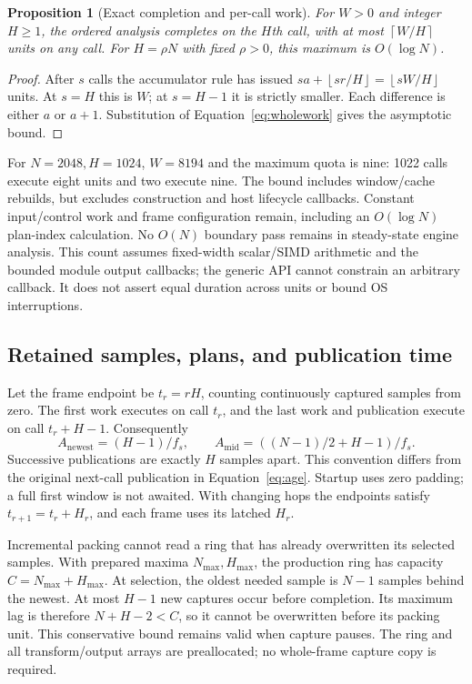 \documentclass[11pt,letterpaper]{article}
\newtheorem{proposition}{Proposition}
\newcommand{\ceil}[1]{\left\lceil #1\right\rceil}
\newcommand{\floor}[1]{\left\lfloor #1\right\rfloor}
\begin{document}
\begin{proposition}[Exact completion and per-call work]
For $W>0$ and integer $H\ge1$, the ordered analysis completes on the $H$th
call, with at most $\ceil{W/H}$ units on any call. For $H=\rho N$ with fixed
$\rho>0$, this maximum is $O(\log N)$.
\end{proposition}
\begin{proof}
After $s$ calls the accumulator rule has issued
$sa+\floor{sr/H}=\floor{sW/H}$ units. At $s=H$ this is $W$;
at $s=H-1$ it is strictly smaller. Each difference is either $a$ or $a+1$.
Substitution of Equation~\eqref{eq:wholework} gives the asymptotic bound.
\end{proof}
For $N=2048,H=1024$, $W=8194$ and the maximum quota is nine: 1022 calls
execute eight units and two execute nine. The bound includes window/cache
rebuilds, but excludes construction and host lifecycle callbacks. Constant
input/control work and frame configuration remain, including an $O(\log N)$
plan-index calculation. No $O(N)$ boundary pass remains in steady-state engine
analysis. This count assumes fixed-width scalar/SIMD arithmetic and the bounded
module output callbacks; the generic API cannot constrain an arbitrary callback.
It does not assert equal duration across units or bound OS interruptions.

\subsection{Retained samples, plans, and publication time}
Let the frame endpoint be $t_r=rH$, counting continuously captured samples
from zero. The first work executes on call $t_r$, and the last work and
publication execute on call $t_r+H-1$. Consequently
\begin{equation}
 A_{\mathrm{newest}}=(H-1)/f_s,\qquad
 A_{\mathrm{mid}}=((N-1)/2+H-1)/f_s.
 \label{eq:wholeage}
\end{equation}
Successive publications are exactly $H$ samples apart. This convention differs
from the original next-call publication in Equation~\eqref{eq:age}. Startup
uses zero padding; a full first window is not awaited. With changing hops the
endpoints satisfy $t_{r+1}=t_r+H_r$, and each frame uses its latched $H_r$.

Incremental packing cannot read a ring that has already overwritten its
selected samples. With prepared maxima $N_{\max},H_{\max}$, the production
ring has capacity $C=N_{\max}+H_{\max}$. At selection, the oldest needed sample
is $N-1$ samples behind the newest. At most $H-1$ new captures occur before
completion. Its maximum lag is therefore $N+H-2<C$, so it cannot be
overwritten before its packing unit. This conservative bound remains valid
when capture pauses. The ring and all transform/output arrays are preallocated;
no whole-frame capture copy is required.
\end{document}
